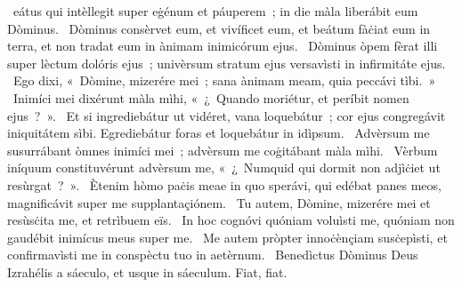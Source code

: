 \psalmChapterWithInscription{}
{ }
{%
~eátus qui intèllegit super eġénum et páuperem~; in die màla liberábit eum Dòminus. 
~Dòminus consèrvet eum, et vivíficet eum, et beátum fàċiat eum in terra, et non tradat eum in ànimam inimicórum ejus. 
~Dòminus òpem fèrat illi super lèctum dolóris ejus~; univèrsum stratum ejus versavìsti in infirmitáte ejus. 
~Ego dixi, «~Dòmine, mizerére mei~; sana ànimam meam, quia peccávi tìbi.~»
~Inimíci mei dixérunt màla mìhi, «~¿~Quando moriétur, et períbit nomen ejus~?~». 
~Et si ingrediebátur ut vidéret, vana loquebátur~; cor ejus congregávit iniquitátem sìbi. Egrediebátur foras et loquebátur in idìpsum. 
~Advèrsum me susurrábant òmnes inimíci mei~; advèrsum me coġitábant màla mìhi. 
~Vèrbum iníquum constituvérunt advèrsum me, «~¿~Numquid qui dormit non adjìċiet ut resùrgat~?~». 
~Ètenim hòmo paċis meae in quo sperávi, qui edébat panes meos, magnificávit super me supplantaçiónem. 
~Tu autem, Dòmine, mizerére mei et resùsċita me, et retrìbuem eïs. 
~In hoc cognóvi quóniam voluìsti me, quóniam non gaudébit inimícus meus super me. 
~Me autem pròpter innoċènçiam susċepìsti, et confirmavìsti me in conspèctu tuo in aetèrnum. 
~Benedìctus Dòminus Deus Izrahélis a sáeculo, et usque in sáeculum. Fiat, fiat. 
}
